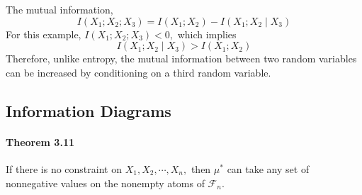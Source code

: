 \documentclass[8pt]{article}
\begin{document}
\noindent The mutual information,
$$
I\left(X_{1} ; X_{2} ; X_{3}\right)=I\left(X_{1} ; X_{2}\right)-I\left(X_{1} ; X_{2} \mid X_{3}\right)
$$
For this example, $I\left(X_{1} ; X_{2} ; X_{3}\right)<0,$ which implies
$$
I\left(X_{1} ; X_{2} \mid X_{3}\right)>I\left(X_{1} ; X_{2}\right)
$$
Therefore, unlike entropy, the mutual information between two random variables can be increased by conditioning on a third random variable.
\subsection{Information Diagrams}
\paragraph{Theorem 3.11} If there is no constraint on $X_{1}, X_{2}, \cdots, X_{n},$ then $\mu^{*}$ can take any set of nonnegative values on the nonempty atoms of $\mathcal{F}_{n}$.
\end{document}
